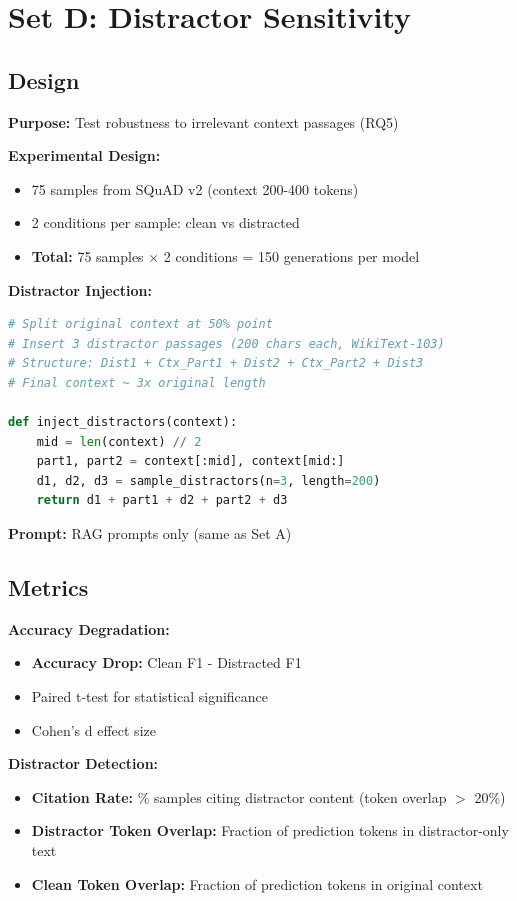 \documentclass[11pt,a4paper]{article}
\begin{document}
\newpage
\section{Set D: Distractor Sensitivity}

\subsection{Design}

\textbf{Purpose:} Test robustness to irrelevant context passages (RQ5)

\textbf{Experimental Design:}
\begin{itemize}
\item 75 samples from SQuAD v2 (context 200-400 tokens)
\item 2 conditions per sample: clean vs distracted
\item \textbf{Total:} 75 samples $\times$ 2 conditions = 150 generations per model
\end{itemize}

\textbf{Distractor Injection:}
\begin{lstlisting}[language=Python]
# Split original context at 50% point
# Insert 3 distractor passages (200 chars each, WikiText-103)
# Structure: Dist1 + Ctx_Part1 + Dist2 + Ctx_Part2 + Dist3
# Final context ~ 3x original length

def inject_distractors(context):
    mid = len(context) // 2
    part1, part2 = context[:mid], context[mid:]
    d1, d2, d3 = sample_distractors(n=3, length=200)
    return d1 + part1 + d2 + part2 + d3
\end{lstlisting}

\textbf{Prompt:} RAG prompts only (same as Set A)

\subsection{Metrics}

\textbf{Accuracy Degradation:}
\begin{itemize}
\item \textbf{Accuracy Drop:} Clean F1 - Distracted F1
\item Paired t-test for statistical significance
\item Cohen's d effect size
\end{itemize}

\textbf{Distractor Detection:}
\begin{itemize}
\item \textbf{Citation Rate:} \% samples citing distractor content (token overlap $>$ 20\%)
\item \textbf{Distractor Token Overlap:} Fraction of prediction tokens in distractor-only text
\item \textbf{Clean Token Overlap:} Fraction of prediction tokens in original context
\end{itemize}
\end{document}
